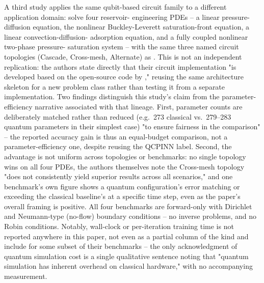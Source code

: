 A third study applies the same qubit-based circuit family to a different
application domain: \citet{qcpinn2025reservoir} solve four reservoir-
engineering PDEs -- a linear pressure-diffusion equation, the nonlinear
Buckley-Leverett saturation-front equation, a linear convection-diffusion-
adsorption equation, and a fully coupled nonlinear two-phase pressure-
saturation system -- with the same three named circuit topologies
(Cascade, Cross-mesh, Alternate) as \citet{farea2025qcpinn}. This is not an
independent replication: the authors state directly that their circuit
implementation "is developed based on the open-source code by
\citet{farea2025qcpinn}," reusing the same architecture skeleton for a new
problem class rather than testing it from a separate implementation. Two
findings distinguish this study's claim from the parameter-efficiency
narrative associated with that lineage. First, parameter counts are
deliberately matched rather than reduced (e.g.\ 273 classical vs.\
279--283 quantum parameters in their simplest case) "to ensure fairness in
the comparison" -- the reported accuracy gain is thus an equal-budget
comparison, not a parameter-efficiency one, despite reusing the QCPINN
label. Second, the advantage is not uniform across topologies or
benchmarks: no single topology wins on all four PDEs, the authors
themselves note the Cross-mesh topology "does not consistently yield
superior results across all scenarios," and one benchmark's own figure
shows a quantum configuration's error matching or exceeding the classical
baseline's at a specific time step, even as the paper's overall framing is
positive. All four benchmarks are forward-only with Dirichlet and
Neumann-type (no-flow) boundary conditions -- no inverse problems, and no
Robin conditions. Notably, wall-clock or per-iteration training time is
not reported anywhere in this paper, not even as a partial column of the
kind \citet{farea2025qcpinn} and \citet{hqpinn2025flow} include for some
subset of their benchmarks -- the only acknowledgment of quantum
simulation cost is a single qualitative sentence noting that "quantum
simulation has inherent overhead on classical hardware," with no
accompanying measurement.


